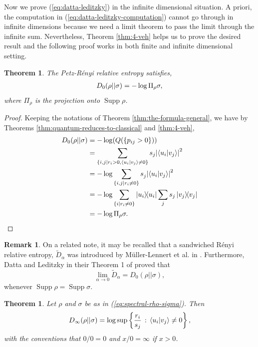 \documentclass[12pt,a4paper,oneside]{article}
\numberwithin{equation}{section}
\theoremstyle{definition}  %
\newtheorem{rmk}[defn]{Remark}
\theoremstyle{plain}  %
\newtheorem{thm}[defn]{Theorem}
\theoremstyle{remark} %
\let\tr\relax
\DeclareMathOperator{\tr}{Tr}
\DeclareMathOperator{\supp}{Supp}
\begin{document}
 Now we prove (\ref{eq:datta-leditzky}) in the infinite dimensional situation. A priori, the computation in (\ref{eq:datta-leditzky-computation}) cannot go through in  infinite dimensions because we need a limit theorem to pass the limit through the infinite sum. Nevertheless, Theorem \ref{thm:4-veh} helps us to prove the desired result and the following proof works in both  finite and infinite dimensional setting.
 \begin{thm}\label{thm:4-veh-quantum}
 The Petz-R\'enyi relative entropy satisfies, \begin{align}\label{eq:datta-leditzky-infinite}
    D_0(\rho||\sigma) = -\log \tr \Pi_{\rho}\sigma,
\end{align}
where $\Pi_{\rho}$ is the projection onto  $\supp \rho$.
 \end{thm}
 \begin{proof}
 Keeping the notations of Theorem \ref{thm:the-formula-general}, we have by Theorems \ref{thm:quantum-reduces-to-classical} and \ref{thm:4-veh},
 \begin{align*}
      D_0(\rho||\sigma) &= -\log (Q ({\{p_{ij}>0\}}))\\
      & = \sum_{\{i,j|r_i>0, \braket{u_i}{v_j}\neq0\}}s_j\abs{\braket{u_i}{v_j}}^2\\
      & = -\log \sum\limits_{\{i,j|r_i\neq 0\}}s_j^{}\abs{\braket{u_i}{v_j}}^2\\
       &=-\log \tr \sum_{\{i|r_i\neq 0\}}\ketbra{u_i}{u_i}\sum_{j}s_j\ketbra{v_j}{v_j}\\
       &= -\log \tr \Pi_{\rho}\sigma.
 \end{align*}
 \end{proof}
 \begin{rmk}
 On a related note, it may be recalled that a sandwiched R\'enyi relative entropy, $\tilde{D}_{\alpha}$ was introduced by M\"{u}ller-Lennert et al. in \cite{muller-tomamichel-etal-2013}. Furthermore, Datta and Leditzky in their Theorem 1 of \cite{Datta_Leditzky_2014} proved that \[\lim_{\alpha\rightarrow 0 }\tilde{D}_{\alpha} = D_0(\rho||\sigma),\]
 whenever $\supp \rho =\supp \sigma$.
 \end{rmk}
 \begin{thm}\label{thm:6-veh-quantum}
Let $\rho$ and $\sigma$ be as in (\ref{eq:spectral-rho-sigma}). Then 
\begin{equation}
 \label{eq:limit-infty-quantum}
 D_{\infty}(\rho||\sigma) = \log \underset{}{\sup}\left\{\frac{r_i}{s_j}\,:\,\braket{u_i}{v_j}\neq 0\right\},
\end{equation}
with the conventions that $0/0 = 0$ and $x/0 = \infty$ if $x>0$. 
 \end{thm}
\end{document}
